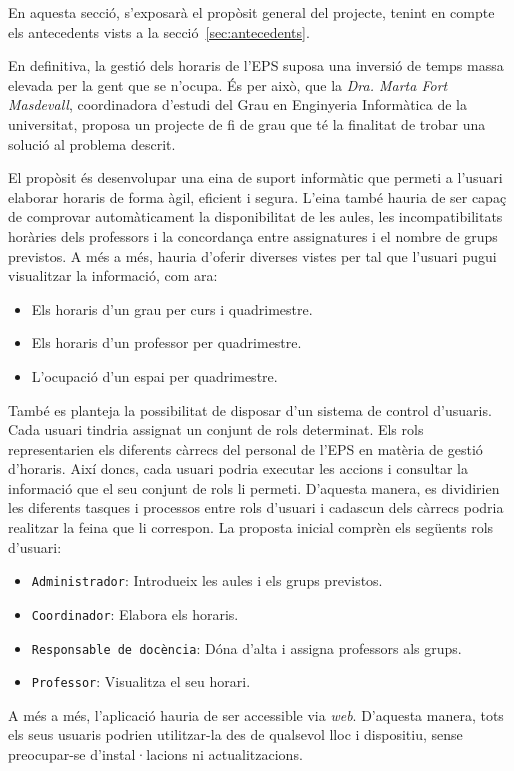 \documentclass[a4paper,12pt]{ThesisStyle}
\begin{document}
En aquesta secció, s'exposarà el propòsit general del projecte, tenint en compte els antecedents vists a la secció~\ref{sec:antecedents}.

En definitiva, la gestió dels horaris de l'EPS suposa una inversió de temps massa elevada per la gent que se n'ocupa. És per això, que la
\emph{Dra. Marta Fort Masdevall}, coordinadora d'estudi del Grau en Enginyeria Informàtica de la universitat, proposa un projecte de fi de grau que té la finalitat
de trobar una solució al problema descrit.

El propòsit és desenvolupar una eina de suport informàtic que permeti a l'usuari elaborar horaris de forma àgil, eficient i segura. L'eina també hauria de ser capaç
de comprovar automàticament la disponibilitat de les aules, les incompatibilitats horàries dels professors i la concordança entre assignatures i el nombre de grups
previstos. A més a més, hauria d'oferir diverses vistes per tal que l'usuari pugui visualitzar la informació, com ara:
\begin{itemize}
  \item Els horaris d'un grau per curs i quadrimestre.
  \item Els horaris d'un professor per quadrimestre.
  \item L'ocupació d'un espai per quadrimestre.
\end{itemize}

També es planteja la possibilitat de disposar d'un sistema de control d'usuaris. Cada usuari tindria assignat un conjunt de rols determinat. Els rols representarien
els diferents càrrecs del personal de l'EPS en matèria de gestió d'horaris. Així doncs, cada usuari podria executar les accions i consultar la informació que el seu
conjunt de rols li permeti. D'aquesta manera, es dividirien les diferents tasques i processos entre rols d'usuari i cadascun dels càrrecs podria realitzar la feina
que li correspon. La proposta inicial comprèn els següents rols d'usuari:
\begin{itemize}
  \item \texttt{Administrador}: Introdueix les aules i els grups previstos.
  \item \texttt{Coordinador}: Elabora els horaris.
  \item \texttt{Responsable de docència}: Dóna d'alta i assigna professors als grups.
  \item \texttt{Professor}: Visualitza el seu horari.
\end{itemize}

A més a més, l'aplicació hauria de ser accessible via \emph{web}. D'aquesta manera, tots els seus usuaris podrien utilitzar-la des de qualsevol lloc i dispositiu, sense
preocupar-se d'instal·lacions ni actualitzacions.
\end{document}
